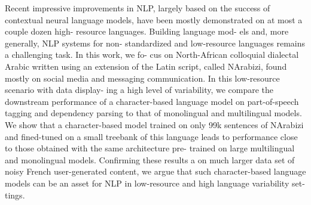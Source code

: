 Recent impressive improvements in NLP, largely based on the success of contextual neural language models, have been mostly demonstrated on at most a couple dozen high- resource languages. Building language mod- els and, more generally, NLP systems for non- standardized and low-resource languages remains a challenging task. In this work, we fo- cus on North-African colloquial dialectal Arabic written using an extension of the Latin script, called NArabizi, found mostly on social media and messaging communication. In this low-resource scenario with data display- ing a high level of variability, we compare the downstream performance of a character-based language model on part-of-speech tagging and dependency parsing to that of monolingual and multilingual models. We show that a character-based model trained on only 99k sentences of NArabizi and fined-tuned on a small treebank of this language leads to performance close to those obtained with the same architecture pre- trained on large multilingual and monolingual models. Confirming these results a on much larger data set of noisy French user-generated content, we argue that such character-based language models can be an asset for NLP in low-resource and high language variability set- tings.
